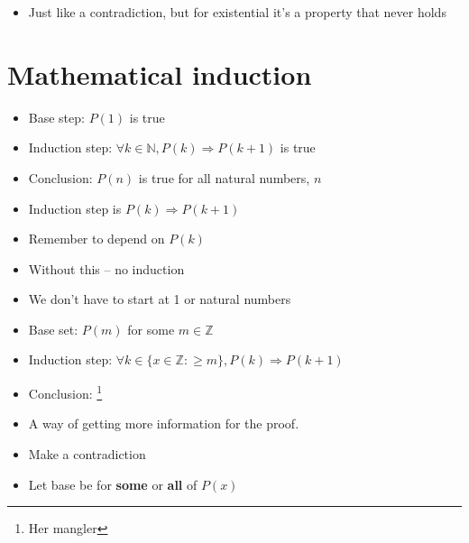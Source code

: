 \documentclass[english,10pt,a4paper]{article}
\begin{document}
\begin{theo} 
\begin{itemize}
\item Just like a contradiction, but for existential it's a property that never holds
\end{itemize}
\end{theo}




\section{Mathematical induction}

\begin{theo}[•] 
\begin{itemize}
\item Base step: $P(1)$ is true
\item Induction step: $\forall k \in \mathbb{N}, P(k) \Rightarrow P(k+1)$ is true
\item Conclusion: $P(n)$ is true for all natural numbers, $n$
\end{itemize}
\end{theo}


\begin{theo} 
\begin{itemize}
\item Induction step is $P(k) \Rightarrow P(k+1)$
\item Remember to depend on $P(k)$
\item Without this -- no induction
\end{itemize}
\end{theo}



\begin{theo} 
\begin{itemize}
\item We don't have to start at 1 or natural numbers
\item Base set: $P(m)$ for some $m\in \mathbb{Z}$
\item Induction step: $\forall k\in \{x \in \mathbb{Z}: \geq m \}, P(k) \Rightarrow P(k+1)$
\item Conclusion: \footnote{Her mangler}
\end{itemize}
\end{theo}


\begin{theo} 
\begin{itemize}
\item A way of getting more information for the proof.
\item Make a contradiction
\end{itemize}
\end{theo}


\begin{theo} 
\begin{itemize}
\item Let base be for \textbf{some} or \textbf{all} of $P(x)$
\end{itemize}
\end{theo}
\end{document}

